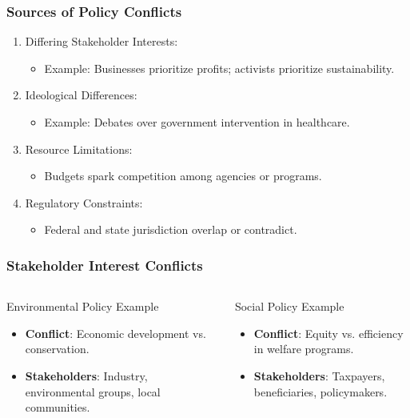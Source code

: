 \documentclass[10pt]{beamer}
\begin{document}
    \begin{frame}
    \frametitle{Sources of Policy Conflicts}
    \begin{enumerate}
        \item Differing Stakeholder Interests:
            \begin{itemize}
                \item Example: Businesses prioritize profits; activists prioritize sustainability.
            \end{itemize}
        \item Ideological Differences:
            \begin{itemize}
                \item Example: Debates over government intervention in healthcare.
            \end{itemize}
        \item Resource Limitations:
            \begin{itemize}
                \item Budgets spark competition among agencies or programs.
            \end{itemize}
        \item Regulatory Constraints:
            \begin{itemize}
                \item Federal and state jurisdiction overlap or contradict.
            \end{itemize}
    \end{enumerate}
    \end{frame}
    
    \begin{frame}
    \frametitle{Stakeholder Interest Conflicts}
    \begin{columns}[T,onlytextwidth]
        \begin{block}{Environmental Policy Example}
            \begin{itemize}
                \item \textbf{Conflict}: Economic development vs. conservation.
                \item \textbf{Stakeholders}: Industry, environmental groups, local communities.
            \end{itemize}
        \end{block}
        \begin{block}{Social Policy Example}
            \begin{itemize}
                \item \textbf{Conflict}: Equity vs. efficiency in welfare programs.
                \item \textbf{Stakeholders}: Taxpayers, beneficiaries, policymakers.
            \end{itemize}
        \end{block}
    \end{columns}
    \end{frame}
    
\end{document}
